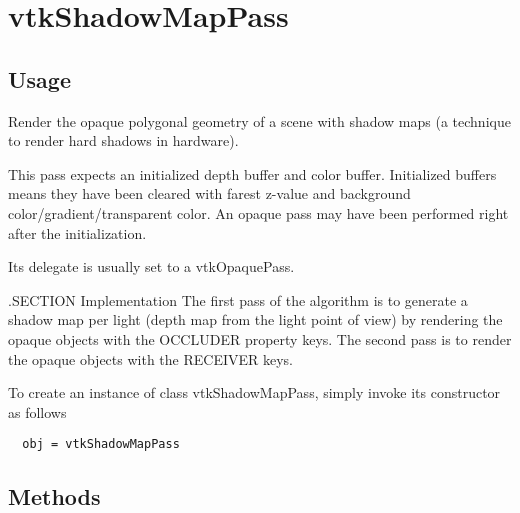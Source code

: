 \section{vtkShadowMapPass}

\subsection{Usage}

 Render the opaque polygonal geometry of a scene with shadow maps (a
 technique to render hard shadows in hardware).

 This pass expects an initialized depth buffer and color buffer.
 Initialized buffers means they have been cleared with farest z-value and
 background color/gradient/transparent color.
 An opaque pass may have been performed right after the initialization.



 Its delegate is usually set to a vtkOpaquePass.

 .SECTION Implementation
 The first pass of the algorithm is to generate a shadow map per light
 (depth map from the light point of view) by rendering the opaque objects
 with the OCCLUDER property keys.
 The second pass is to render the opaque objects with the RECEIVER keys.


To create an instance of class vtkShadowMapPass, simply
invoke its constructor as follows
\begin{verbatim}
  obj = vtkShadowMapPass
\end{verbatim}
\subsection{Methods}

